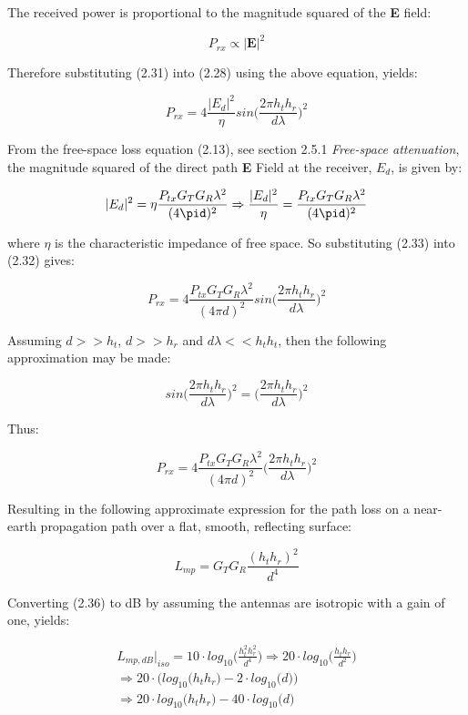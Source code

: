 The received power is proportional to the magnitude squared of the \textbf{E} field:

$$P_{rx} \propto |\textbf{E}|^2$$


Therefore substituting (2.31) into (2.28) using the above equation, yields:

\begin{equation}
  P_{rx} = 4 \frac{|E_d|^2}{\eta}sin\Big(\frac{2 \pi h_th_r}{d\lambda}\Big)^2
\end{equation}

From the free-space loss equation (2.13), see section 2.5.1 \textit{Free-space attenuation}, the magnitude squared of the direct path \textbf{E} Field at the receiver, $E_d$, is given by:

\begin{equation}
  |E_d|^2 = \eta \frac{P_{tx}G_TG_R\lambda^2}{(4\pid)^2} \Rightarrow \frac{|E_d|^2}{\eta} = \frac{P_{tx}G_TG_R\lambda^2}{(4\pid)^2}
\end{equation}

where $\eta$ is the characteristic impedance of free space. So substituting (2.33) into (2.32) gives:

\begin{equation}
  P_{rx} = 4 \frac{P_{tx}G_TG_R\lambda^2}{(4\pi d)^2}sin\Big(\frac{2 \pi h_th_r}{d\lambda}\Big)^2
\end{equation}

Assuming $d>>h_t$, $d>>h_r$ and $d\lambda << h_th_t$, then the following approximation may be made:

$$sin\Big(\frac{2 \pi h_th_r}{d\lambda}\Big)^2=\Big(\frac{2 \pi h_th_r}{d\lambda}\Big)^2$$

Thus:

\begin{equation}
  P_{rx} = 4 \frac{P_{tx}G_TG_R\lambda^2}{(4\pi d)^2}\Big(\frac{2 \pi h_th_r}{d\lambda}\Big)^2
\end{equation}

Resulting in the following approximate expression for the path loss on a near-earth propagation path over a flat, smooth, reflecting surface:

\begin{equation}
  L_{mp}= G_TG_R \frac{(h_th_r)^2}{d^4}
\end{equation}

Converting (2.36) to dB by assuming the antennas are isotropic with a gain of one, yields:

\begin{equation}
\begin{split}
  L_{mp,dB}|_{iso} = 10 \cdot log_{10}\Big(\frac{h_t^2h_r^2}{d^4}\Big) \Rightarrow 20 \cdot log_{10}\Big(\frac{h_th_r}{d^2}\Big) \\ \Rightarrow  20 \cdot (log_{10}\Big(h_th_r\Big) - 2 \cdot log_{10}\Big(d\Big)\Big) \\ \Rightarrow  20 \cdot log_{10}\Big(h_th_r\Big) - 40 \cdot log_{10}\Big(d\Big)
\end{split}
\end{equation}

